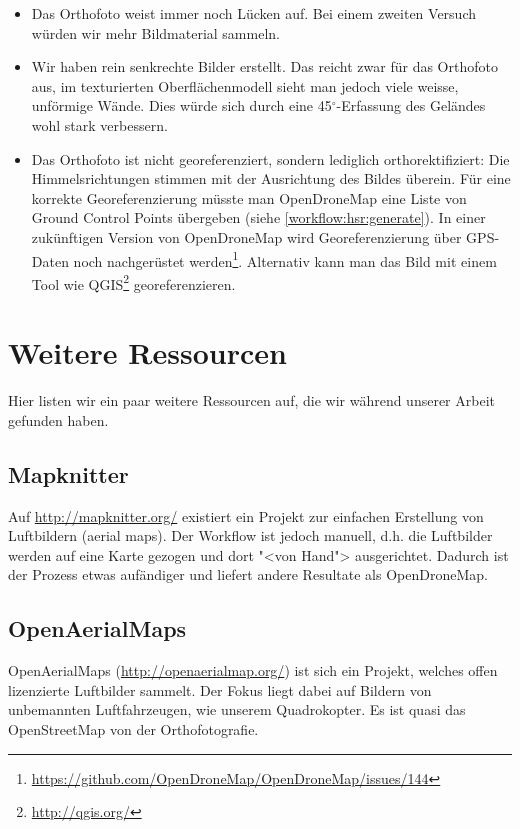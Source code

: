 \begin{itemize}
	\item Das Orthofoto weist immer noch Lücken auf. Bei einem zweiten Versuch
		würden wir mehr Bildmaterial sammeln.
	\item Wir haben rein senkrechte Bilder erstellt. Das reicht zwar für das
		Orthofoto aus, im texturierten Oberflächenmodell sieht man jedoch viele
		weisse, unförmige Wände. Dies würde sich durch eine 45$^{\circ}$-Erfassung des
		Geländes wohl stark verbessern.
	\item Das Orthofoto ist nicht georeferenziert, sondern lediglich
		orthorektifiziert: Die Himmelsrichtungen stimmen mit der Ausrichtung des
		Bildes überein. Für eine korrekte Georeferenzierung müsste man OpenDroneMap
		eine Liste von Ground Control Points übergeben (siehe
		\autoref{workflow:hsr:generate}). In einer zukünftigen Version von
		OpenDroneMap wird Georeferenzierung über GPS-Daten noch nachgerüstet
		werden\footnote{\url{https://github.com/OpenDroneMap/OpenDroneMap/issues/144}}.
		Alternativ kann man das Bild mit einem Tool wie
		QGIS\footnote{\url{http://qgis.org/}} georeferenzieren.
\end{itemize}


\section{Weitere Ressourcen}

Hier listen wir ein paar weitere Ressourcen auf, die wir während unserer Arbeit
gefunden haben.

\subsection{Mapknitter}

Auf \url{http://mapknitter.org/} existiert ein Projekt zur einfachen Erstellung
von Luftbildern (aerial maps). Der Workflow ist jedoch manuell, d.h. die
Luftbilder werden auf eine Karte gezogen und dort "<von Hand"> ausgerichtet.
Dadurch ist der Prozess etwas aufändiger und liefert andere Resultate als
OpenDroneMap.

\subsection{OpenAerialMaps}

OpenAerialMaps (\url{http://openaerialmap.org/}) ist sich ein Projekt, welches
offen lizenzierte Luftbilder sammelt. Der Fokus liegt dabei auf Bildern von
unbemannten Luftfahrzeugen, wie unserem Quadrokopter. Es ist quasi das
OpenStreetMap von der Orthofotografie.
